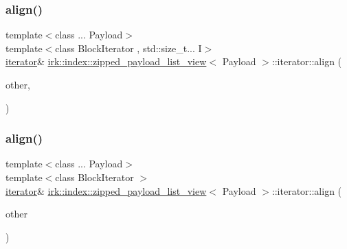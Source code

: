 \subsubsection{\texorpdfstring{align()}{align()}\hspace{0.1cm}{\footnotesize\ttfamily [1/2]}}
{\footnotesize\ttfamily template$<$class ... Payload$>$ \\
template$<$class Block\+Iterator , std\+::size\+\_\+t... I$>$ \\
\mbox{\hyperlink{classirk_1_1index_1_1zipped__payload__list__view_1_1iterator}{iterator}}\& \mbox{\hyperlink{classirk_1_1index_1_1zipped__payload__list__view}{irk\+::index\+::zipped\+\_\+payload\+\_\+list\+\_\+view}}$<$ Payload $>$\+::iterator\+::align (\begin{DoxyParamCaption}\item[{const Block\+Iterator \&}]{other,  }\item[{std\+::index\+\_\+sequence$<$ I... $>$}]{ }\end{DoxyParamCaption})\hspace{0.3cm}{\ttfamily [inline]}}

\mbox{\label{classirk_1_1index_1_1zipped__payload__list__view_1_1iterator_a5b941810905eb53ba4d1a0ee5a7b501a}} 
\subsubsection{\texorpdfstring{align()}{align()}\hspace{0.1cm}{\footnotesize\ttfamily [2/2]}}
{\footnotesize\ttfamily template$<$class ... Payload$>$ \\
template$<$class Block\+Iterator $>$ \\
\mbox{\hyperlink{classirk_1_1index_1_1zipped__payload__list__view_1_1iterator}{iterator}}\& \mbox{\hyperlink{classirk_1_1index_1_1zipped__payload__list__view}{irk\+::index\+::zipped\+\_\+payload\+\_\+list\+\_\+view}}$<$ Payload $>$\+::iterator\+::align (\begin{DoxyParamCaption}\item[{const Block\+Iterator \&}]{other }\end{DoxyParamCaption})\hspace{0.3cm}{\ttfamily [inline]}}

